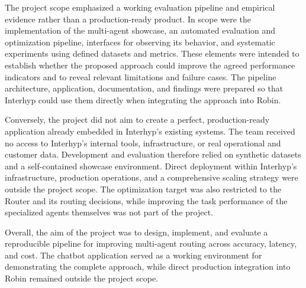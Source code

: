 The project scope emphasized a working evaluation pipeline and empirical evidence rather than a production-ready product. In scope were the implementation of the multi-agent showcase, an automated evaluation and optimization pipeline, interfaces for observing its behavior, and systematic experiments using defined datasets and metrics. These elements were intended to establish whether the proposed approach could improve the agreed performance indicators and to reveal relevant limitations and failure cases. The pipeline architecture, application, documentation, and findings were prepared so that Interhyp could use them directly when integrating the approach into Robin.

Conversely, the project did not aim to create a perfect, production-ready application already embedded in Interhyp's existing systems. The team received no access to Interhyp's internal tools, infrastructure, or real operational and customer data. Development and evaluation therefore relied on synthetic datasets and a self-contained showcase environment. Direct deployment within Interhyp's infrastructure, production operations, and a comprehensive scaling strategy were outside the project scope. The optimization target was also restricted to the Router and its routing decisions, while improving the task performance of the specialized agents themselves was not part of the project.

Overall, the aim of the project was to design, implement, and evaluate a reproducible pipeline for improving multi-agent routing across accuracy, latency, and cost. The chatbot application served as a working environment for demonstrating the complete approach, while direct production integration into Robin remained outside the project scope.
